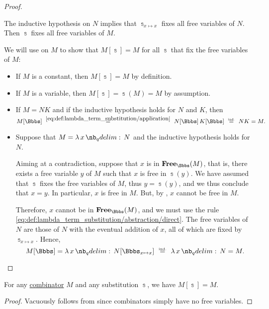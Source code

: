\begin{proof}
\begin{itemize}
    The inductive hypothesis on \( N \) implies that \( \Bbbs_{x \mapsto x} \) fixes all free variables of \( N \). Then \( \Bbbs \) fixes all free variables of \( M \).
  \end{itemize}

  \NecessitySubProof We will use  on \( M \) to show that \( M[\Bbbs] = M \) for all \( \Bbbs \) that fix the free variables of \( M \):
  \begin{itemize}
    \item If \( M \) is a constant, then \( M[\Bbbs] = M \) by definition.
    \item If \( M \) is a variable, then \( M[\Bbbs] = \Bbbs(M) = M \) by assumption.
    \item If \( M = NK \) and if the inductive hypothesis holds for \( N \) and \( K \), then
    \begin{equation*}
      M[\Bbbs]
      \reloset {\eqref{eq:def:lambda_term_substitution/application}} =
      N[\Bbbs] \thinspace K[\Bbbs]
      \reloset {\T{ind.}} =
      N K
      =
      M.
    \end{equation*}

    \item Suppose that \( M = \qabs x N \) and the inductive hypothesis holds for \( N \).

    Aiming at a contradiction, suppose that \( x \) is in \( \op*{Free}_\Bbbs(M) \), that is, there exists a free variable \( y \) of \( M \) such that \( x \) is free in \( \Bbbs(y) \). We have assumed that \( \Bbbs \) fixes the free variables of \( M \), thus \( y = \Bbbs(y) \), and we thus conclude that \( x = y \). In particular, \( x \) is free in \( M \). But, by , \( x \) cannot be free in \( M \).

    Therefore, \( x \) cannot be in \( \op*{Free}_\Bbbs(M) \), and we must use the rule \eqref{eq:def:lambda_term_substitution/abstraction/direct}. The free variables of \( N \) are those of \( N \) with the eventual addition of \( x \), all of which are fixed by \( \Bbbs_{x \mapsto x} \). Hence,
    \begin{equation*}
      M[\Bbbs]
      =
      \qabs x N[\Bbbs_{x \mapsto x}]
      \reloset {\T{ind.}} =
      \qabs x N
      =
      M.
    \end{equation*}
  \end{itemize}
\end{proof}

\begin{corollary}\label{thm:lambda_substitution_combinators}
  For any \hyperref[def:lambda_combinator]{combinator} \( M \) and any substitution \( \Bbbs \), we have \( M[\Bbbs] = M \).
\end{corollary}
\begin{proof}
  Vacuously follows from  since combinators simply have no free variables.
\end{proof}

